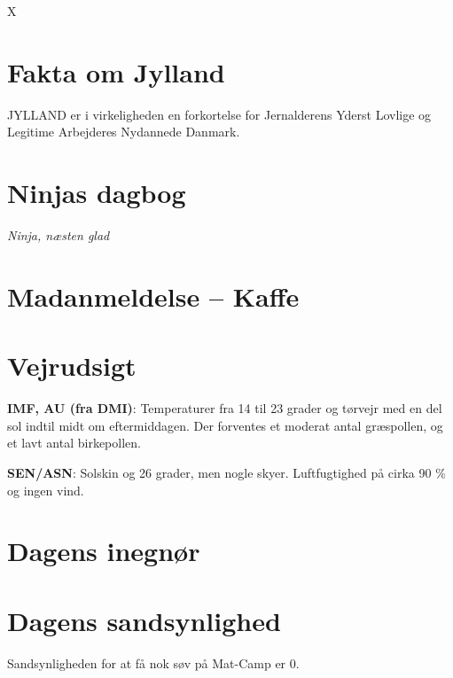 

\begin{minipage}[b]{0.95\linewidth}
\begin{minipage}[t]{0.47\textwidth}
\vspace{1mm}
X
\vspace{-7mm}

\section*{Fakta om Jylland}
JYLLAND er i virkeligheden en forkortelse for Jernalderens Yderst Lovlige og Legitime Arbejderes Nydannede Danmark.

\vspace{-3mm}

\section*{Ninjas dagbog}


{\flushright\emph{Ninja, næsten glad}}

\vspace{-3mm}
\section*{Madanmeldelse -- Kaffe}


\end{minipage}%
\hfill\begin{minipage}[t]{0.47\textwidth}
\vspace{2mm}
\section*{Vejrudsigt}
\textbf{IMF, AU (fra DMI)}: Temperaturer fra 14 til 23 grader og tørvejr med en del sol indtil midt om eftermiddagen. Der forventes et moderat antal græspollen, og et lavt antal birkepollen.

\textbf{SEN/ASN}: Solskin og 26 grader, men nogle skyer. Luftfugtighed på cirka 90 \% og ingen vind.

\vspace{-2mm}
\section*{Dagens inegnør}

\vspace{-4mm}
\section*{Dagens sandsynlighed}
Sandsynligheden for at få nok søv på Mat-Camp er $0$.


\end{minipage}
\end{minipage}
